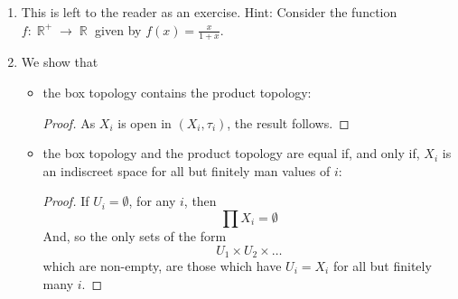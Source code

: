 \documentclass{book}
\DeclareMathOperator*{\R}{\mathbb{R}}
\begin{document}
\begin{enumerate}[(1)]
    \item This is left to the reader as an exercise. Hint: Consider the function $f: \R^+ \rightarrow \R$ given by $f(x) = \frac{x}{1+x}$.

    \item We show that
        \begin{itemize}
            \item the box topology contains the product topology: 
                \begin{proof} As $X_i$ is open in $(X_i, \tau_i)$, the result follows. 
                \end{proof}
            \item the box topology and the product topology are equal if, and only if, $X_i$ is an indiscreet space for all but finitely man values of $i$: 
                \begin{proof} If $U_i = \emptyset$, for any $i$, then
                    \[\prod X_i = \emptyset\]
                    And, so the only sets of the form 
                    \[U_1 \times U_2 \times \dots \]
                    which are non-empty, are those which have $U_i = X_i$ for all but finitely many $i$. 
                \end{proof}
        \end{itemize}

\end{enumerate}
\end{document}
